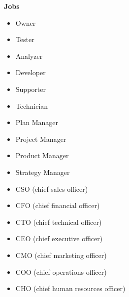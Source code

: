 \documentclass[11pt,a4paper]{article}
\begin{document}
\textbf{Jobs}\\[-7.5mm]
\begin{itemize}
    \item Owner\\[-7.5mm]
    \item Tester\\[-7.5mm]
    \item Analyzer\\[-7.5mm]
    \item Developer\\[-7.5mm]
    \item Supporter\\[-7.5mm]
    \item Technician\\[-7.5mm]
    \item Plan Manager\\[-7.5mm]
    \item Project Manager\\[-7.5mm]
    \item Product Manager\\[-7.5mm]
    \item Strategy Manager\\[-7.5mm]
    \item CSO (chief sales officer)\\[-7.5mm]
    \item CFO (chief financial officer)\\[-7.5mm]
    \item CTO (chief technical officer)\\[-7.5mm]
    \item CEO (chief executive officer)\\[-7.5mm]
    \item CMO (chief marketing officer)\\[-7.5mm]
    \item COO (chief operations officer)\\[-7.5mm]
    \item CHO (chief human resources officer)
\end{itemize}
\end{document}
